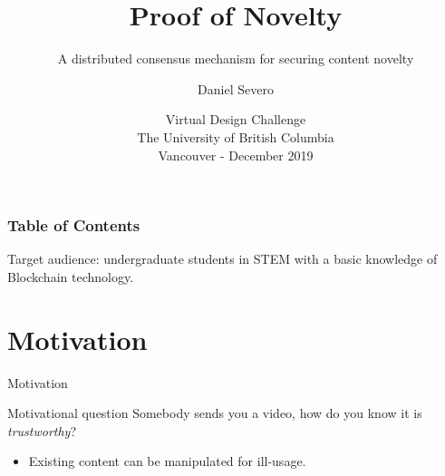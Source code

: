 \documentclass{beamer}
\title[Proof of Novelty] %
{Proof of Novelty}
\subtitle{A distributed consensus mechanism for securing content novelty}
\author[\href{https://dsevero.com}{dsevero.com}] %
{Daniel Severo}
\institute %
{Independent Scientist}
\date[VDC 2019] %
{Virtual Design Challenge \\ The University of British Columbia \\ Vancouver - December 2019}
\begin{document}
\frame{\titlepage}


\begin{frame}
\frametitle{Table of Contents}
\tableofcontents

Target audience: undergraduate students in STEM with a basic knowledge of Blockchain technology.
\end{frame}


\section{Motivation}
\begin{frame}{Motivation}
    \begin{block}{Motivational question}
        Somebody sends you a video, how do you know it is \emph{trustworthy}?
    \end{block}\pause
    
    \vfill
    
    \begin{itemize}
        \item Existing content can be manipulated for ill-usage.
    \end{itemize}
    
    \vfill
    
    \begin{figure}
    \end{figure}
    
\end{frame}
\end{document}
